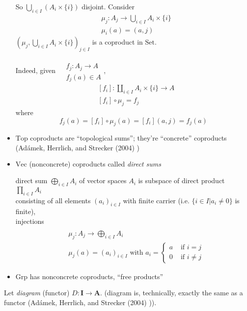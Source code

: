 \documentclass[twoside,landscape,10pt]{amsart}
\theoremstyle{plain}
\theoremstyle{definition}
\theoremstyle{remark}
\begin{document}
\begin{multicols*}{2}
\begin{itemize}
So $\bigcup_{i\in I } (A_i \times \lbrace i \rbrace)$ disjoint.  Consider 
\[
\begin{aligned}
  &  \mu_j : A_j \to \bigcup_{i \in I} A_i \times \lbrace i \rbrace \\ 
  &  \mu_i(a) = (a,j)
\end{aligned}
\]
$(\mu_j, \bigcup_{i\in I} A_i \times \lbrace i \rbrace )_{j\in I}$ is a coproduct in $\text{Set}$.  

Indeed, given $\begin{aligned} & \quad \\
  & f_j:A_j \to A \\
  & f_j(a) \in A \end{aligned}$, 
\[
\begin{aligned}
  & [f_i] : \coprod_{i\in I} A_i \times \lbrace i \rbrace \to A \\ 
  & [f_i]\circ \mu_j = f_j 
\end{aligned}
\]
where
\[
f_j(a) = [f_i]\circ \mu_j(a) = [f_i](a,j) = f_j(a)
\]
  \item  $\text{Top}$ coproducts are ``topological sums''; they're ``concrete'' coproducts (Ad\'{a}mek, Herrlich, and Strecker (2004) \cite{AHS2004})
\item $\text{Vec}$ (nonconcrete) coproducts called \emph{direct sums}

direct sum $\bigoplus_{i\in I} A_i$ of vector spaces $A_i$ is subspace of direct product $\prod_{i\in I} A_i$ \\
consisting of all elements $(a_i)_{i\in I}$ with finite carrier (i.e. $\lbrace i \in I | a_i \neq 0 \rbrace$ is finite), \\
\qquad injections \[
\begin{aligned} & \quad \\
  & \mu_j : A_j \to \bigoplus_{i\in I } A_i  \\
  & \mu_j(a) = (a_i)_{i\in I} \text { with } a_i = \begin{cases} a & \text{ if } i = j  \\ 0 & \text{ if } i \neq j \end{cases}
\end{aligned}
\]

\item $\text{Grp}$ has nonconcrete coproducts, ``free products''
\end{itemize}

Let \emph{diagram} (functor) $D: \mathbf{I} \to \mathbf{A}$.  (diagram is, technically, exactly the same as a functor (Ad\'{a}mek, Herrlich, and Strecker (2004) \cite{AHS2004})).  


\end{multicols*}
\end{document}
